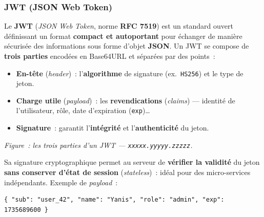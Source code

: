 \newpage

\subsubsection*{JWT (JSON Web Token)}
{}

\noindent Le \textbf{JWT} (\textit{JSON Web Token}, norme \textbf{RFC 7519}) est un standard ouvert définissant un format \textbf{compact et autoportant} pour échanger de manière sécurisée des informations sous forme d'objet \textbf{JSON}. Un JWT se compose de \textbf{trois parties} encodées en Base64URL et séparées par des points~:
\begin{itemize}
	\item \textbf{En-tête} (\textit{header})~: l'\textbf{algorithme} de signature (ex.~\texttt{HS256}) et le type de jeton.
	\item \textbf{Charge utile} (\textit{payload})~: les \textbf{revendications} (\textit{claims}) — identité de l'utilisateur, rôle, date d'expiration (\texttt{exp})…
	\item \textbf{Signature}~: garantit l'\textbf{intégrité} et l'\textbf{authenticité} du jeton.
\end{itemize}
\begin{center}
\end{center}
\noindent\textit{Figure~: les trois parties d'un JWT — \texttt{xxxxx.yyyyy.zzzzz}.}

\noindent Sa signature cryptographique permet au serveur de \textbf{vérifier la validité} du jeton \textbf{sans conserver d'état de session} (\textit{stateless})~: idéal pour des micro-services indépendants. Exemple de \textit{payload}~:
\begin{verbatim}
{ "sub": "user_42", "name": "Yanis", "role": "admin", "exp": 1735689600 }
\end{verbatim}

